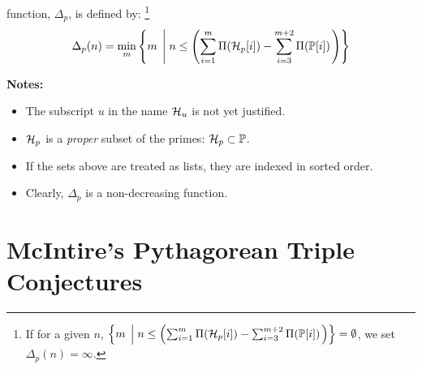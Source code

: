 \documentclass{article}
\theoremstyle{definition}
\begin{document}
 function, $\Delta_p$, is defined by:%
\footnote{If for a given $n$, 
$\left\{ m \; \left| \; n \le \left( \sum_{i=1}^m \Pi({\cal H}_p[i]) - \sum_{i=3}^{m+2} \Pi(\mathbb{P}[i]) \right. \right) \right\} = \emptyset$, we set $\Delta_p(n) = \infty$.}
\begin{eqnarray}
\Delta_p(n) = \mathop{\rm min}\limits_{m} \left\{ m \; \left| \; n \le \left( \sum_{i=1}^m \Pi({\cal H}_p[i]) - \sum_{i=3}^{m+2} \Pi(\mathbb{P}[i])\right. \right) \right\} 
\end{eqnarray}

{\bf Notes:} 
\begin{itemize}
  \item{The subscript $u$ in the name ${\cal H}_u$ is not yet justified.}
  \item{${\cal H}_p$ is a {\em proper\/} subset of the primes: ${\cal H}_p \subset \mathbb{P}$.}
  \item{If the sets above are treated as lists, they are indexed in sorted order.}
  \item{Clearly, $\Delta_p$ is a non-decreasing function.}
\end{itemize}


\section{McIntire's Pythagorean Triple Conjectures}
\end{document}
